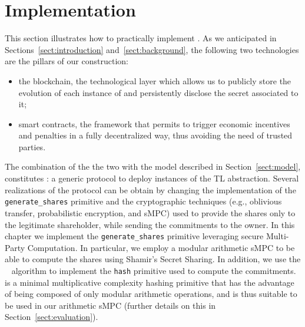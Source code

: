 \section{Implementation}\label{sect:realization}

This section illustrates how to practically implement \shortname. 
\newline
As we anticipated in Sections~\ref{sect:introduction} and~\ref{sect:background}, the following two technologies are the pillars of our construction:
\begin{itemize}
	\item the blockchain, the technological layer which allows us to publicly store the evolution of each instance of \shortname and persistently disclose the secret associated to it;
	\item smart contracts, the framework that permits to trigger economic incentives and penalties in a fully decentralized way, thus avoiding the need of trusted parties.
\end{itemize}
The combination of the the two with the model described in Section~\ref{sect:model}, constitutes \shortname: a generic protocol to deploy instances of the TL abstraction.
Several realizations of the \shortname protocol can be obtain by changing the implementation of the \texttt{generate\_shares} primitive and the cryptographic techniques (e.g., oblivious transfer, probabilistic encryption, and sMPC) used to provide the shares only to the legitimate shareholder, while sending the commitments to the owner.
In this chapter we implement the \texttt{generate\_shares} primitive leveraging secure Multi-Party Computation.
In particular, we employ a modular arithmetic sMPC to be able to compute the shares using Shamir's Secret Sharing.
In addition, we use the {\em \mimc}~\cite{albrecht2016mimc} algorithm to implement the \texttt{hash} primitive used to compute the commitments.
\mimc is a minimal multiplicative complexity hashing primitive that has the advantage of being composed of only modular arithmetic operations, and is thus suitable to be used in our arithmetic sMPC
(further details on this in Section~\ref{sect:evaluation}).
  

